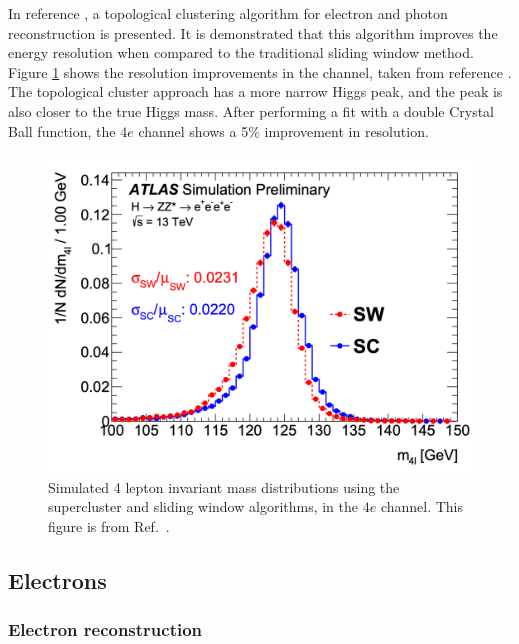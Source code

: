 In reference \cite{ATL-PHYS-PUB-2017-022}, a topological clustering algorithm for electron and photon reconstruction is presented. It is demonstrated that this algorithm improves the energy resolution when compared to the traditional sliding window method. Figure \ref{fig:H4l_topo_cluster} shows the resolution improvements in the \HFourL channel, taken from reference \cite{ATL-PHYS-PUB-2017-022}. The topological cluster approach has a more narrow Higgs peak, and the peak is also closer to the true Higgs mass. After performing a fit with a double Crystal Ball function, the $4e$ channel shows a 5\% improvement in resolution.
\begin{figure}
    \centering
    \includegraphics[width=\mediumfigwidth]{Figures/LHC/H4l_topo_cluster.png}
    \caption{Simulated 4 lepton invariant mass distributions using the supercluster and sliding window algorithms, in the $4e$ channel. This figure is from Ref.~\cite{ATL-PHYS-PUB-2017-022}.}
    \label{fig:H4l_topo_cluster}
\end{figure}

\subsection{Electrons}
\label{ssec:electronreco}
\subsubsection{Electron reconstruction}

